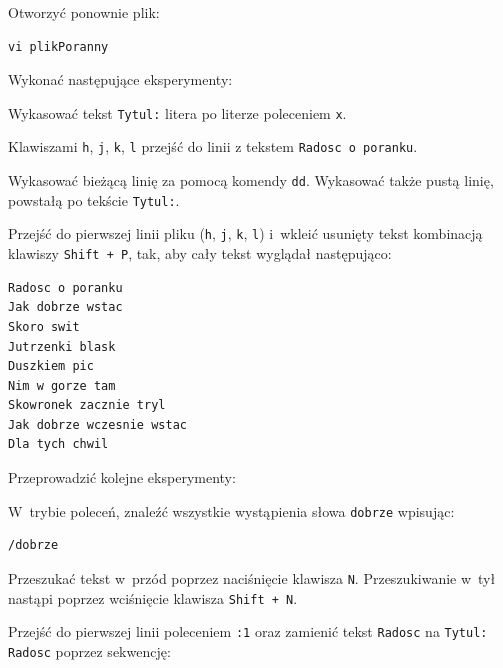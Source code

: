 \begin{example}
Otworzyć ponownie plik: 

\begin{lstlisting}[style=MyBashStyle]
vi plikPoranny
\end{lstlisting}

Wykonać następujące eksperymenty: 

\begin{myitemize}
\item Wykasować tekst \lstinline[style=MyBashStyle]{Tytul:} litera po literze poleceniem \lstinline[style=MyBashStyle]{x}.
\item Klawiszami \lstinline[style=MyBashStyle]{h}, \lstinline[style=MyBashStyle]{j}, \lstinline[style=MyBashStyle]{k}, \lstinline[style=MyBashStyle]{l} przejść do linii z tekstem \lstinline[style=MyBashStyle]{Radosc o poranku}.  
\item Wykasować bieżącą linię za pomocą komendy \lstinline[style=MyBashStyle]{dd}. Wykasować także pustą linię, powstałą po tekście \lstinline[style=MyBashStyle]{Tytul:}. 
\item Przejść do pierwszej linii pliku (\lstinline[style=MyBashStyle]{h}, \lstinline[style=MyBashStyle]{j}, \lstinline[style=MyBashStyle]{k}, \lstinline[style=MyBashStyle]{l}) i~wkleić usunięty tekst kombinacją klawiszy \lstinline[style=MyBashStyle]{Shift + P}, tak, aby cały tekst wyglądał następująco: 
\end{myitemize}

\begin{lstlisting}[style=MyBashStyle]
Radosc o poranku
Jak dobrze wstac
Skoro swit
Jutrzenki blask
Duszkiem pic
Nim w gorze tam
Skowronek zacznie tryl
Jak dobrze wczesnie wstac
Dla tych chwil
\end{lstlisting}

Przeprowadzić kolejne eksperymenty: 

\begin{myitemize}
\item W~trybie poleceń, znaleźć wszystkie wystąpienia słowa \lstinline[style=MyBashStyle]{dobrze} wpisując: 
\end{myitemize}

\begin{lstlisting}[style=MyBashStyle]
/dobrze
\end{lstlisting}
\begin{myitemize}
\item Przeszukać tekst w~przód poprzez naciśnięcie klawisza \lstinline[style=MyBashStyle]{N}. Przeszukiwanie w~tył nastąpi poprzez wciśnięcie klawisza \lstinline[style=MyBashStyle]{Shift + N}.
\item Przejść do pierwszej linii poleceniem \lstinline[style=MyBashStyle]{:1} oraz zamienić tekst \lstinline[style=MyBashStyle]
{Radosc} na \lstinline[style=MyBashStyle]{Tytul: Radosc} poprzez sekwencję: 
\end{myitemize}


\end{example}
